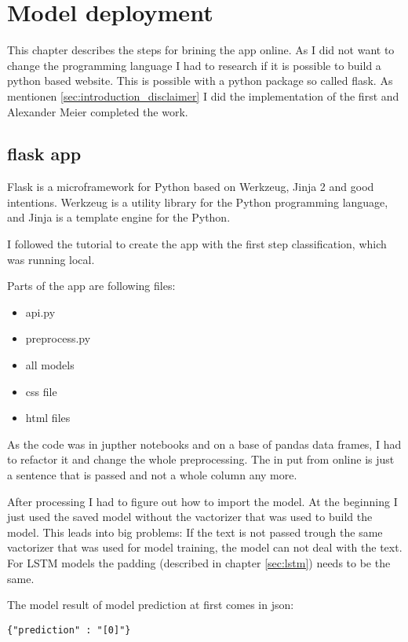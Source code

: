 \chapter{Model deployment}
\label{chap:model_deployment}
This chapter describes the steps for brining the app online. As I did not want to change the programming language I had to research if it is possible to build a python based website. This is possible with a python package so called flask. 
As mentionen \ref{sec:introduction_disclaimer} I did the implementation of the first and Alexander Meier completed the work.

\section{flask app}
\label{sec:flask_app} 
Flask is a microframework for Python based on Werkzeug, Jinja 2 and good intentions. \cite{flask} Werkzeug is a utility library for the Python programming language, and Jinja  is a template engine for the Python.

I followed the tutorial \cite{flask_tut} to create the app with the first step classification, which was running local. 


Parts of the app are following files:
\begin{itemize}
  \item api.py
  \item preprocess.py
  \item all models
  \item css file
  \item html files
\end{itemize}

As the code was in jupther notebooks and on a base of pandas data frames, I had to refactor it and change the whole preprocessing. The in put from online is just a sentence that is passed and not a whole column any more. 

After processing I had to figure out how to import the model. At the beginning I just used the saved model without the vactorizer that was used to build the model. This leads into big problems: If the text is not passed trough the same vactorizer that was used for model training, the model can not deal with the text. For LSTM models the padding (described in chapter \ref{sec:lstm}) needs to be the same.

The model result of model prediction at first comes in json:

\begin{lstlisting}[float=h,frame=tb,caption={Model prediction json},label=lst:model_prediction]
		{"prediction" : "[0]"}
\end{lstlisting}  

